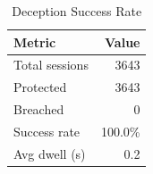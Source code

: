 \begin{table}[t]
\centering
\caption{Deception Success Rate}
\label{tab:deception}
\begin{tabular}{lr}
\toprule
Metric & Value \\
\midrule
Total sessions & 3643 \\
Protected & 3643 \\
Breached & 0 \\
Success rate & 100.0\% \\
Avg dwell (s) & 0.2 \\
\bottomrule
\end{tabular}
\end{table}